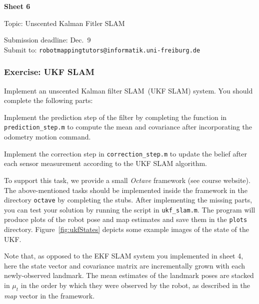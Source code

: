 \documentclass[12pt]{article}
\begin{document}


\begin{center}
{\bf \Large Sheet 6}

{\large Topic: Unscented Kalman Fitler SLAM}

Submission deadline: Dec.~9\\
Submit to: \texttt{robotmappingtutors@informatik.uni-freiburg.de}
\end{center}

\subsubsection*{Exercise: UKF SLAM}

Implement an unscented Kalman filter SLAM~(UKF SLAM) system. You should
complete the following parts:

\begin{enumialpha}


\item Implement the prediction step of the filter by completing the
  function in \texttt{prediction\_step.m} to compute the mean and
  covariance after incorporating the odometry motion command.

\item Implement the correction step in \texttt{correction\_step.m} to
  update the belief after each sensor measurement according to the UKF
  SLAM algorithm.

\end{enumialpha}

To support this task, we provide a small \emph{Octave} framework (see
course website). The above-mentioned tasks should be implemented inside
the framework in the directory \texttt{octave} by completing the stubs.
After implementing the missing parts, you can test your solution by
running the script in \texttt{ukf\_slam.m}. The program will produce
plots of the robot pose and map estimates and save them in the
\texttt{plots} directory. Figure~\ref{fig:ukfStates} depicts some
example images of the state of the UKF.

Note that, as opposed to the EKF SLAM system you implemented in sheet 4,
here the state vector and covariance matrix are incrementally grown with
each newly-observed landmark. The mean estimates of the landmark poses
are stacked in $\mu_t$ in the order by which they were observed by the
robot, as described in the \emph{map} vector in the framework.
\end{document}
